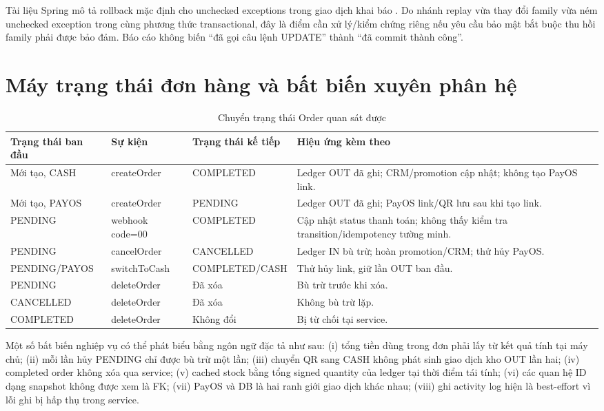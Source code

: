 \documentclass[12pt,a4paper,oneside]{report}
\begin{document}
\noindent Tài liệu Spring mô tả rollback mặc định cho unchecked exceptions trong giao dịch khai báo \cite{springtx}. Do nhánh replay vừa thay đổi family vừa ném unchecked exception trong cùng phương thức transactional, đây là điểm cần xử lý/kiểm chứng riêng nếu yêu cầu bảo mật bắt buộc thu hồi family phải được bảo đảm. Báo cáo không biến “đã gọi câu lệnh UPDATE” thành “đã commit thành công”.

\section{Máy trạng thái đơn hàng và bất biến xuyên phân hệ}
\begin{table}[htbp]
\centering\small
\caption{Chuyển trạng thái Order quan sát được}
\begin{tabularx}{\textwidth}{@{}p{2.8cm}p{3.3cm}p{5.2cm}Y@{}}\toprule
Trạng thái ban đầu & Sự kiện & Trạng thái kế tiếp & Hiệu ứng kèm theo\\\midrule
Mới tạo, CASH & createOrder & COMPLETED & Ledger OUT đã ghi; CRM/promotion cập nhật; không tạo PayOS link.\\
Mới tạo, PAYOS & createOrder & PENDING & Ledger OUT đã ghi; PayOS link/QR lưu sau khi tạo link.\\
PENDING & webhook code=00 & COMPLETED & Cập nhật status thanh toán; không thấy kiểm tra transition/idempotency tường minh.\\
PENDING & cancelOrder & CANCELLED & Ledger IN bù trừ; hoàn promotion/CRM; thử hủy PayOS.\\
PENDING/PAYOS & switchToCash & COMPLETED/CASH & Thử hủy link, giữ lần OUT ban đầu.\\
PENDING & deleteOrder & Đã xóa & Bù trừ trước khi xóa.\\
CANCELLED & deleteOrder & Đã xóa & Không bù trừ lặp.\\
COMPLETED & deleteOrder & Không đổi & Bị từ chối tại service.\\
\bottomrule\end{tabularx}
\end{table}

Một số bất biến nghiệp vụ có thể phát biểu bằng ngôn ngữ đặc tả như sau: (i) tổng tiền dùng trong đơn phải lấy từ kết quả tính tại máy chủ; (ii) mỗi lần hủy PENDING chỉ được bù trừ một lần; (iii) chuyển QR sang CASH không phát sinh giao dịch kho OUT lần hai; (iv) completed order không xóa qua service; (v) cached stock bằng tổng signed quantity của ledger tại thời điểm tái tính; (vi) các quan hệ ID dạng snapshot không được xem là FK; (vii) PayOS và DB là hai ranh giới giao dịch khác nhau; (viii) ghi activity log hiện là best-effort vì lỗi ghi bị hấp thụ trong service.
\end{document}
